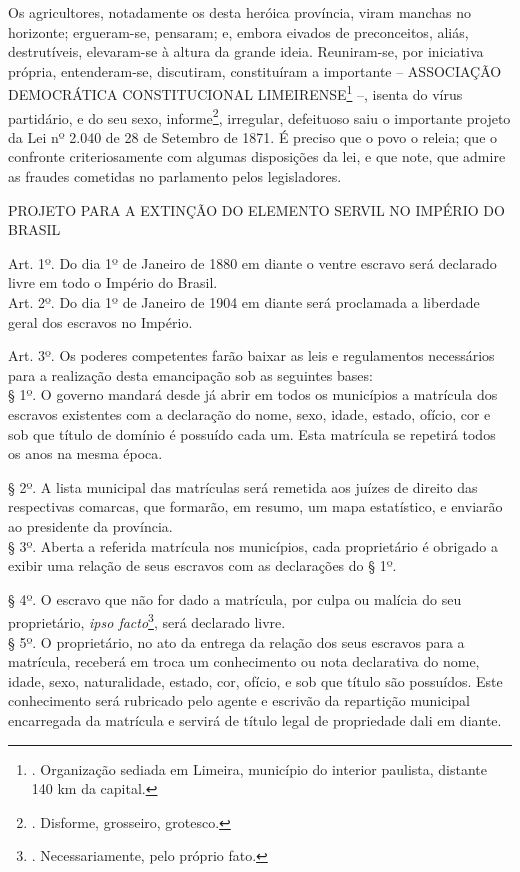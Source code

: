 Os agricultores, notadamente os desta heróica província, viram manchas
no horizonte; ergueram-se, pensaram; e, embora eivados de preconceitos,
aliás, destrutíveis, elevaram-se à altura da grande ideia. Reuniram-se,
por iniciativa própria, entenderam-se, discutiram, constituíram a
importante -- ASSOCIAÇÃO DEMOCRÁTICA CONSTITUCIONAL LIMEIRENSE\footnote{.
  Organização sediada em Limeira, município do interior paulista,
  distante 140 km da capital.} --, isenta do vírus partidário, e do seu
sexo, informe\footnote{. Disforme, grosseiro, grotesco.}, irregular,
defeituoso saiu o importante projeto da Lei nº 2.040 de 28 de Setembro
de 1871. É preciso que o povo o releia; que o confronte criteriosamente
com algumas disposições da lei, e que note, que admire as fraudes
cometidas no parlamento pelos legisladores.

PROJETO PARA A EXTINÇÃO DO ELEMENTO SERVIL NO IMPÉRIO DO BRASIL

Art. 1º. Do dia 1º de Janeiro de 1880 em diante o ventre escravo será
declarado livre em todo o Império do Brasil.\\
Art. 2º. Do dia 1º de Janeiro de 1904 em diante será proclamada a
liberdade geral dos escravos no Império.

Art. 3º. Os poderes competentes farão baixar as leis e regulamentos
necessários para a realização desta emancipação sob as seguintes
bases:\\
§ 1º. O governo mandará desde já abrir em todos os municípios a
matrícula dos escravos existentes com a declaração do nome, sexo, idade,
estado, ofício, cor e sob que título de domínio é possuído cada um. Esta
matrícula se repetirá todos os anos na mesma época.

§ 2º. A lista municipal das matrículas será remetida aos juízes de
direito das respectivas comarcas, que formarão, em resumo, um mapa
estatístico, e enviarão ao presidente da província.\\
§ 3º. Aberta a referida matrícula nos municípios, cada proprietário é
obrigado a exibir uma relação de seus escravos com as declarações do §
1º.

§ 4º. O escravo que não for dado a matrícula, por culpa ou malícia do
seu proprietário, \emph{ipso facto}\footnote{. Necessariamente, pelo
  próprio fato.}, será declarado livre.\\
§ 5º. O proprietário, no ato da entrega da relação dos seus escravos
para a matrícula, receberá em troca um conhecimento ou nota declarativa
do nome, idade, sexo, naturalidade, estado, cor, ofício, e sob que
título são possuídos. Este conhecimento será rubricado pelo agente e
escrivão da repartição municipal encarregada da matrícula e servirá de
título legal de propriedade dali em diante.


